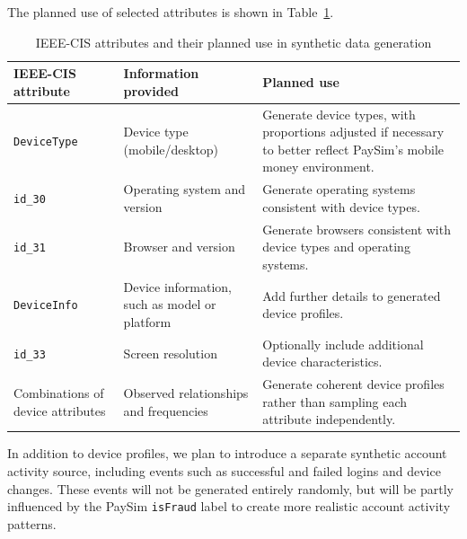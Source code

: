 \documentclass[titlepage]{article}
\begin{document}
The planned use of selected attributes is shown in Table~\ref{tab:ieee_attributes}.
\begin{table}[H]
    \centering
    \caption{IEEE-CIS attributes and their planned use in synthetic data generation}
    \label{tab:ieee_attributes}
    \small
    \renewcommand{\arraystretch}{1.3}
    \begin{tabularx}{\textwidth}{@{}lXX@{}}
        \toprule
        \textbf{IEEE-CIS attribute} & \textbf{Information provided} & \textbf{Planned use} \\
        \midrule

        \texttt{DeviceType} & Device type (mobile/desktop) & Generate device types, with proportions adjusted if necessary to better reflect PaySim's mobile money environment. \\

        \addlinespace

        \texttt{id\_30} & Operating system and version & Generate operating systems consistent with device types. \\

        \addlinespace

        \texttt{id\_31} & Browser and version & Generate browsers consistent with device types and operating systems. \\

        \addlinespace

        \texttt{DeviceInfo} & Device information, such as model or platform & Add further details to generated device profiles. \\

        \addlinespace

        \texttt{id\_33} & Screen resolution & Optionally include additional device characteristics. \\

        \addlinespace

        Combinations of device attributes & Observed relationships and frequencies & Generate coherent device profiles rather than sampling each attribute independently. \\

        \bottomrule
    \end{tabularx}
\end{table}

In addition to device profiles, we plan to introduce a separate synthetic account activity source, including events such as successful and failed logins and device changes. These events will not be generated entirely randomly, but will be partly influenced by the PaySim \texttt{isFraud} label to create more realistic account activity patterns.
\end{document}
